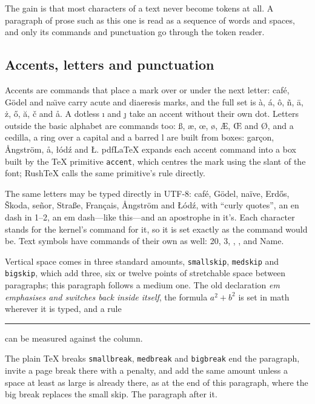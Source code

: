 \documentclass{article}
\numberwithin{equation}{section}
\theoremstyle{definition}
\theoremstyle{remark}
\begin{document}
The gain is that most characters of a text never become tokens at all. A paragraph of
prose such as this one is read as a sequence of words and spaces, and only its commands
and punctuation go through the token reader.

\subsection{Accents, letters and punctuation}

Accents are commands that place a mark over or under the next letter: caf\'e, G\"odel
and na\"\i ve carry acute and diaeresis marks, and the full set is \`a, \'a, \^o,
\~n, \=a, \.z, \H{o}, \u{a}, \v{c} and \r{a}. A dotless \i{} and \j{} take an accent
without their own dot. Letters outside the basic alphabet are commands too: \ss, \ae,
\oe, \o, \AE, \OE{} and \O, and a cedilla, a ring over a capital and a barred l are
built from boxes: gar\c{c}on, \AA ngstr\"om, \aa, \l\'od\'z and \L. pdfLaTeX expands each accent command into a box built by
the \TeX{} primitive \texttt{accent}, which centres the mark using the slant of the
font; RushTeX calls the same primitive's rule directly.

The same letters may be typed directly in UTF-8: café, Gödel, naïve, Erdős, Škoda,
señor, Straße, Français, Ångström and Łódź, with “curly quotes”, an en dash in 1–2, an em dash—like this—and an
apostrophe in it’s. Each character stands for the kernel's command for it, so it is set
exactly as the command would be. Text symbols have commands of their own as well:
20\textdegree, 3, , \textcopyright, \textregistered{} and
Name\texttrademark.

\medskip
\noindent Vertical space comes in three standard amounts, \texttt{smallskip},
\texttt{medskip} and \texttt{bigskip}, which add three, six or twelve points of stretchable space between
paragraphs; this paragraph follows a medium one. The old declaration {\em em
emphasises {\em and switches back} inside itself}, the formula \ensuremath{a^2+b^2}
is set in math wherever it is typed, and a rule \rule{0.2\columnwidth}{0.4pt} can be
measured against the column.\thispagestyle{plain}
\smallskip

\noindent The plain \TeX{} breaks \texttt{smallbreak}, \texttt{medbreak} and
\texttt{bigbreak} end the paragraph, invite a page break there with a penalty, and add
the same amount unless a space at least as large is already there, as at the end of this
paragraph, where the big break replaces the small skip.
\smallskip
\bigbreak
\noindent The paragraph after it.
\end{document}
